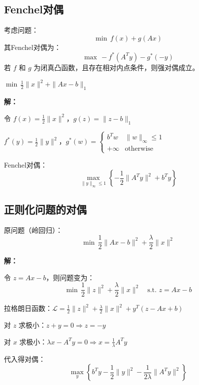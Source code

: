 \subsection{Fenchel对偶}

\begin{theorem}[Fenchel对偶]
考虑问题：
\[
\min \, f(x) + g(Ax)
\]
其Fenchel对偶为：
\[
\max \, -f^*(A^T y) - g^*(-y)
\]
若 $f$ 和 $g$ 为闭真凸函数，且存在相对内点条件，则强对偶成立。
\end{theorem}

\begin{example}[Fenchel对偶]
$\min \, \frac{1}{2}\|x\|^2 + \|Ax - b\|_1$

\textbf{解：}

令 $f(x) = \frac{1}{2}\|x\|^2$，$g(z) = \|z - b\|_1$

$f^*(y) = \frac{1}{2}\|y\|^2$，$g^*(w) = \begin{cases} b^T w & \|w\|_\infty \leq 1 \\ +\infty & \text{otherwise} \end{cases}$

Fenchel对偶：
\[
\max_{\|y\|_\infty \leq 1} \left\{-\frac{1}{2}\|A^T y\|^2 + b^T y\right\}
\]
\end{example}

\subsection{正则化问题的对偶}

\begin{example}[L2正则化的对偶]
原问题（岭回归）：
\[
\min \, \frac{1}{2}\|Ax - b\|^2 + \frac{\lambda}{2}\|x\|^2
\]

\textbf{解：}

令 $z = Ax - b$，则问题变为：
\[
\min \, \frac{1}{2}\|z\|^2 + \frac{\lambda}{2}\|x\|^2 \quad \text{s.t. } z = Ax - b
\]

拉格朗日函数：$\mathcal{L} = \frac{1}{2}\|z\|^2 + \frac{\lambda}{2}\|x\|^2 + y^T(z - Ax + b)$

对 $z$ 求极小：$z + y = 0 \Rightarrow z = -y$

对 $x$ 求极小：$\lambda x - A^T y = 0 \Rightarrow x = \frac{1}{\lambda}A^T y$

代入得对偶：
\[
\max_y \left\{b^T y - \frac{1}{2}\|y\|^2 - \frac{1}{2\lambda}\|A^T y\|^2\right\}
\]
\end{example}

